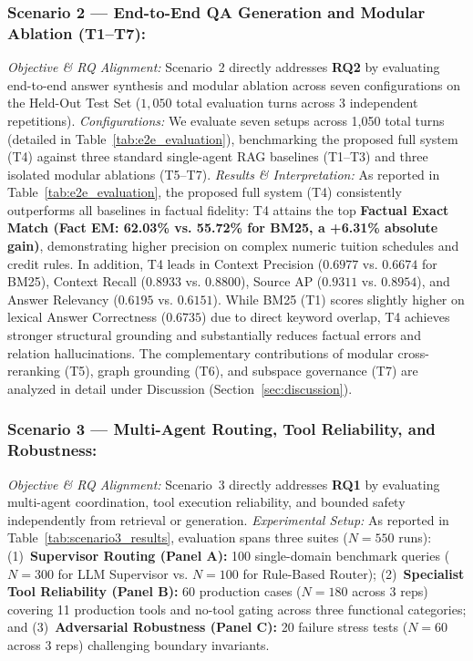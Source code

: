 \subsubsection{Scenario 2 --- End-to-End QA Generation and Modular Ablation (T1--T7):}
\emph{Objective \& RQ Alignment:} Scenario~2 directly addresses \textbf{RQ2} by evaluating end-to-end answer synthesis and modular ablation across seven configurations on the Held-Out Test Set ($1,050$ total evaluation turns across 3 independent repetitions).
\emph{Configurations:} We evaluate seven setups across 1,050 total turns (detailed in Table~\ref{tab:e2e_evaluation}), benchmarking the proposed full system (T4) against three standard single-agent RAG baselines (T1--T3) and three isolated modular ablations (T5--T7).
\emph{Results \& Interpretation:} As reported in Table~\ref{tab:e2e_evaluation}, the proposed full system (T4) consistently outperforms all baselines in factual fidelity: T4 attains the top \textbf{Factual Exact Match (Fact EM: 62.03\% vs. 55.72\% for BM25, a +6.31\% absolute gain)}, demonstrating higher precision on complex numeric tuition schedules and credit rules. In addition, T4 leads in Context Precision ($0.6977$ vs. $0.6674$ for BM25), Context Recall ($0.8933$ vs. $0.8800$), Source AP ($0.9311$ vs. $0.8954$), and Answer Relevancy ($0.6195$ vs. $0.6151$). While BM25 (T1) scores slightly higher on lexical Answer Correctness ($0.6735$) due to direct keyword overlap, T4 achieves stronger structural grounding and substantially reduces factual errors and relation hallucinations. The complementary contributions of modular cross-reranking (T5), graph grounding (T6), and subspace governance (T7) are analyzed in detail under Discussion (Section~\ref{sec:discussion}).

\subsubsection{Scenario 3 --- Multi-Agent Routing, Tool Reliability, and Robustness:}
\emph{Objective \& RQ Alignment:} Scenario~3 directly addresses \textbf{RQ1} by evaluating multi-agent coordination, tool execution reliability, and bounded safety independently from retrieval or generation.
\emph{Experimental Setup:} As reported in Table~\ref{tab:scenario3_results}, evaluation spans three suites ($N=550$ runs): (1)~\textbf{Supervisor Routing (Panel A):} 100 single-domain benchmark queries ($N=300$ for LLM Supervisor vs. $N=100$ for Rule-Based Router); (2)~\textbf{Specialist Tool Reliability (Panel B):} 60 production cases ($N=180$ across 3 reps) covering 11 production tools and no-tool gating across three functional categories; and (3)~\textbf{Adversarial Robustness (Panel C):} 20 failure stress tests ($N=60$ across 3 reps) challenging boundary invariants.


